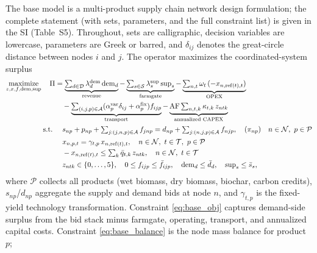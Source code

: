 The base model is a multi-product supply chain network design formulation; the
complete statement (with sets, parameters, and the full constraint list) is
given in the SI (Table~S5). Throughout, sets are calligraphic, decision
variables are lowercase, parameters are Greek or barred, and $\delta_{ij}$
denotes the great-circle distance between nodes $i$ and $j$. The operator
maximizes the coordinated-system surplus
\begin{subequations}
\label{eq:base}
\begin{align}
\mathop{\mathrm{maximize}}_{z,x,f,\mathrm{dem},\mathrm{sup}}\quad
\Pi & = \underbrace{\textstyle\sum_{d\in\mathcal{D}} \lambda^{\mathrm{dem}}_{d}\,\mathrm{dem}_{d}}_{\text{revenue}}
- \underbrace{\textstyle\sum_{s\in\mathcal{S}} \lambda^{\mathrm{sup}}_{s}\,\mathrm{sup}_{s}}_{\text{farmgate}}
- \underbrace{\textstyle\sum_{n,t} \omega_{t}\,(-x_{n,\mathrm{ref}(t),t})}_{\text{OPEX}}
\notag\\
&\quad - \underbrace{\textstyle\sum_{(i,j,p)\in\mathcal{A}}(\alpha^{\mathrm{var}}_{p}\delta_{ij}+\alpha^{\mathrm{fix}}_{p})f_{ijp}}_{\text{transport}}
- \underbrace{\mathrm{AF}\textstyle\sum_{n,t,k}\kappa_{t,k}\,z_{ntk}}_{\text{annualized CAPEX}}
\label{eq:base_obj}\\
\ \mathrm{s.t.}\  & \quad s_{np} + p_{np} + \textstyle\sum_{j:(j,n,p)\in\mathcal{A}} f_{jnp} =
d_{np} + \textstyle\sum_{j:(n,j,p)\in\mathcal{A}} f_{njp},
\quad (\pi_{np}) \quad n\in\mathcal{N},\ p\in\mathcal{P} \label{eq:base_balance}\\
& \quad x_{n,p,t} = \gamma_{t,p}\,x_{n,\mathrm{ref}(t),t}, \quad n\in\mathcal{N},\ t\in\mathcal{T},\ p\in\mathcal{P} \label{eq:base_yield}\\
& \quad -x_{n,\mathrm{ref}(t),t} \le \textstyle\sum_{k} \bar{q}_{t,k}\,z_{ntk}, \quad n\in\mathcal{N},\ t\in\mathcal{T} \label{eq:base_cap}\\
& \quad z_{ntk}\in\{0,\dots,5\}, \quad 0\le f_{ijp}\le \bar{f}_{ijp}, \quad \mathrm{dem}_d\le\bar{d}_d, \quad \mathrm{sup}_s\le\bar{s}_s \label{eq:base_bounds},
\end{align}
\end{subequations}
where $\mathcal{P}$ collects all products (wet biomass, dry biomass, biochar,
carbon credits), $s_{np}$/$d_{np}$ aggregate the supply and demand bids at node
$n$, and $\gamma_{t,p}$ is the fixed-yield technology transformation.
Constraint \eqref{eq:base_obj} captures demand-side surplus from the bid stack
minus farmgate, operating, transport, and annualized capital costs.
Constraint \eqref{eq:base_balance} is the node mass balance for product $p$;

